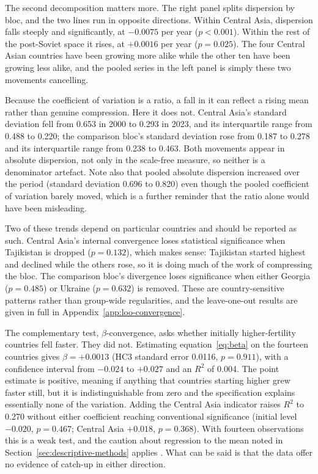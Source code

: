 The second decomposition matters more. The right panel splits dispersion by bloc, and the two lines run in opposite directions. Within Central Asia, dispersion falls steeply and significantly, at $-0.0075$ per year ($p < 0.001$). Within the rest of the post-Soviet space it rises, at $+0.0016$ per year ($p = 0.025$). The four Central Asian countries have been growing more alike while the other ten have been growing less alike, and the pooled series in the left panel is simply these two movements cancelling.

Because the coefficient of variation is a ratio, a fall in it can reflect a rising mean rather than genuine compression. Here it does not. Central Asia's standard deviation fell from 0.653 in 2000 to 0.293 in 2023, and its interquartile range from 0.488 to 0.220; the comparison bloc's standard deviation rose from 0.187 to 0.278 and its interquartile range from 0.238 to 0.463. Both movements appear in absolute dispersion, not only in the scale-free measure, so neither is a denominator artefact. Note also that pooled absolute dispersion increased over the period (standard deviation 0.696 to 0.820) even though the pooled coefficient of variation barely moved, which is a further reminder that the ratio alone would have been misleading.

Two of these trends depend on particular countries and should be reported as such. Central Asia's internal convergence loses statistical significance when Tajikistan is dropped ($p = 0.132$), which makes sense: Tajikistan started highest and declined while the others rose, so it is doing much of the work of compressing the bloc. The comparison bloc's divergence loses significance when either Georgia ($p = 0.485$) or Ukraine ($p = 0.632$) is removed. These are country-sensitive patterns rather than group-wide regularities, and the leave-one-out results are given in full in Appendix~\ref{app:loo-convergence}.

The complementary test, $\beta$-convergence, asks whether initially higher-fertility countries fell faster. They did not. Estimating equation~\eqref{eq:beta} on the fourteen countries gives $\beta = +0.0013$ (HC3 standard error 0.0116, $p = 0.911$), with a confidence interval from $-0.024$ to $+0.027$ and an $R^2$ of 0.004. The point estimate is positive, meaning if anything that countries starting higher grew faster still, but it is indistinguishable from zero and the specification explains essentially none of the variation. Adding the Central Asia indicator raises $R^2$ to 0.270 without either coefficient reaching conventional significance (initial level $-0.020$, $p = 0.467$; Central Asia $+0.018$, $p = 0.368$). With fourteen observations this is a weak test, and the caution about regression to the mean noted in Section~\ref{sec:descriptive-methods} applies \parencite{quah1993}. What can be said is that the data offer no evidence of catch-up in either direction.

